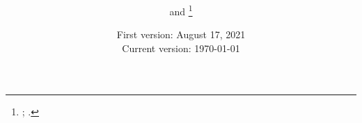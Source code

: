 \documentclass[12pt,english]{article}
\begin{document}
\title{
\onehalfspacing
\PAPERTITLE
}

\author{
\AUTHORHADAH{} and \AUTHORCOMP{}\thanks{
\AUTHORHADAHINFO;
\AUTHORCOMPINFO.
\ACKNOWLEDGMENTS
}}

\date{
    First version: August 17, 2021 \\
    Current version: \today
}

\maketitle


\begin{abstract}
\singlespacing
\PAPERABSTRACT
\end{abstract}
\vfil
\hfil \small\PAPERKEYWORDS \hfil
\vfil
\thispagestyle{empty}
\clearpage

\setcounter{page}{1}
\renewcommand*{\thefootnote}{\arabic{footnote}}

\clearpage

\begingroup
{}
\setlength\bibitemsep{5pt}
\printbibliography[title=References]
\endgroup
\pagebreak



\appendix
\setlength{\footnotemargin}{5.75mm}



% 
\clearpage
\end{document}
